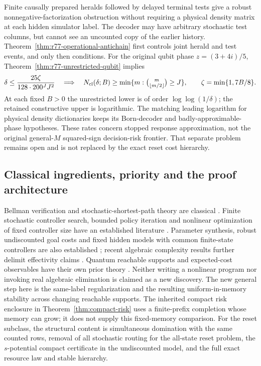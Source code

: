 Finite causally prepared heralds followed by delayed terminal tests
give a robust nonnegative-factorization obstruction without requiring
a physical density matrix at each hidden simulator label.  The
decoder may have arbitrary stochastic test columns, but cannot see an
uncounted copy of the earlier history.  Theorem~\ref{thm:r77-operational-antichain}
first controls joint herald and test events, and only then conditions.
For the original qubit phase $z=(3+4i)/5$,
Theorem~\ref{thm:r77-unrestricted-qubit} implies
\begin{equation}\label{eq:r77-intro-arithmetic}
 \delta\le\frac{25\zeta}{128\cdot200^J J^2}
 \quad\Longrightarrow\quad N_{\rm cl}(\delta;B)\ge
 \min\{m:\tbinom m{\lfloor m/2\rfloor}\ge J\},
 \qquad\zeta=\min\{1,7B/8\}.
\end{equation}
At each fixed $B>0$ the unrestricted lower is of order
$\log\log(1/\delta)$; the retained constructive upper is logarithmic.
The matching leading logarithm for physical density dictionaries keeps
its Born-decoder and badly-approximable-phase hypotheses.  These rates
concern stopped response approximation, not the original general-$M$
squared-sign decision-risk frontier.  That separate problem remains
open and is not replaced by the exact reset cost hierarchy.

\subsection*{Classical ingredients, priority and the proof architecture}

Bellman verification and stochastic-shortest-path theory are classical
\cite{BertsekasTsitsiklis91}.  Finite stochastic controller search,
bounded policy iteration and nonlinear optimization of fixed controller
size have an established literature
\cite{Meuleau99,PoupartBoutilier03,AmatoBernsteinZilberstein10}.
Parameter synthesis, robust undiscounted goal costs and fixed hidden
models with common finite-state controllers are also established
\cite{JungesEtAl18,CubuktepeEtAl21,GaleslootEtAl25}; recent algebraic
complexity results further delimit effectivity claims
\cite{BovyEtAl26}.  Quantum reachable supports and expected-cost
observables have their own prior theory
\cite{YuYing12,YingFengYuYing13,LiuZhouBartheYing25,AvanziniEtAl22}.
Neither writing a nonlinear program nor invoking real algebraic
elimination is claimed as a new discovery.  The new general step here
is the same-label regularization and the resulting uniform-in-memory
stability across changing reachable supports.  The inherited compact
risk enclosure in Theorem~\ref{thm:compact-risk} uses a finite-prefix
completion whose memory can grow; it does not supply this fixed-memory
comparison.  For the reset subclass, the structural content is simultaneous domination with the same counted rows,
removal of all stochastic routing for the all-state reset problem,
the $s$-potential compact certificate in the undiscounted model,
and the full exact resource law and stable hierarchy.

